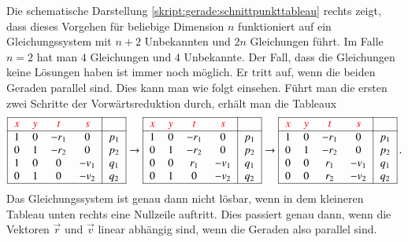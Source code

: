 Die schematische Darstellung 
\eqref{skript:gerade:schnittpunkttableau}
rechts zeigt, dass dieses Vorgehen für beliebige Dimension $n$
funktioniert auf ein Gleichungssystem mit $n+2$ Unbekannten und
$2n$ Gleichungen führt.
Im Falle $n=2$ hat man $4$ Gleichungen und $4$ Unbekannte.
Der Fall, dass die Gleichungen keine Lösungen haben ist immer noch
möglich.
Er tritt auf, wenn die beiden Geraden parallel sind.
Dies kann man wie folgt einsehen.
Führt man die ersten zwei Schritte der Vorwärtsreduktion durch,
erhält man die Tableaux
\[
\begin{tabular}{|>{$}c<{$}>{$}c<{$}>{$}c<{$}>{$}c<{$}|>{$}c<{$}|}
\hline
\color{red}x&\color{red}y&\color{red}t&\color{red}s&\\
\hline
1&0&-r_1&   0&p_1\\
0&1&-r_2&   0&p_2\\
1&0&   0&-v_1&q_1\\
0&1&   0&-v_2&q_2\\
\hline
\end{tabular}
\rightarrow
\begin{tabular}{|>{$}c<{$}>{$}c<{$}>{$}c<{$}>{$}c<{$}|>{$}c<{$}|}
\hline
\color{red}x&\color{red}y&\color{red}t&\color{red}s&\\
\hline
1&0&-r_1&   0&p_1\\
0&1&-r_2&   0&p_2\\
0&0& r_1&-v_1&q_1\\
0&1&   0&-v_2&q_2\\
\hline
\end{tabular}
\rightarrow
\begin{tabular}{|>{$}c<{$}>{$}c<{$}>{$}c<{$}>{$}c<{$}|>{$}c<{$}|}
\hline
\color{red}x&\color{red}y&\color{red}t&\color{red}s&\\
\hline
1&0&-r_1&   0&p_1\\
0&1&-r_2&   0&p_2\\
0&0& r_1&-v_1&q_1\\
0&0& r_2&-v_2&q_2\\
\hline
\end{tabular}\,.
\]
Das Gleichungssystem ist genau dann nicht lösbar, wenn in dem kleineren
Tableau unten rechts eine Nullzeile auftritt.
Dies passiert genau dann, wenn die Vektoren $\vec{r}$ und $\vec{v}$ 
linear abhängig sind, wenn die Geraden also parallel sind.

%
%
